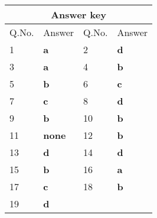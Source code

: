  \setlength\arrayrulewidth{1pt}
 \begin{table}[H]
 	\centering
 	
 	\begin{tabular}{|p{1.5cm}|p{1.5cm}||p{1.5cm}|p{1.5cm}|}
 		\hline
 		\multicolumn{4}{|c|}{\textbf{Answer key}}\\\hline\hline
 		\rowcolor{ocrel}Q.No.&Answer&Q.No.&Answer\\\hline
 		1&\textbf{a}&2&\textbf{d}\\\hline
 		3&\textbf{a}&4&\textbf{b}\\\hline
 		5&\textbf{b}&6&\textbf{c}\\\hline
 		7&\textbf{c}&8&\textbf{d}\\\hline
 		9&\textbf{b}&10&\textbf{b}\\\hline
 		11&\textbf{none}&12&\textbf{b}\\\hline
 		13&\textbf{d}&14&\textbf{d}\\\hline
 		15&\textbf{b}&16&\textbf{a}\\\hline
 		17&\textbf{c}&18&\textbf{b}\\\hline
 		19&\textbf{d}&&\\\hline
 	\end{tabular}
 \end{table}




